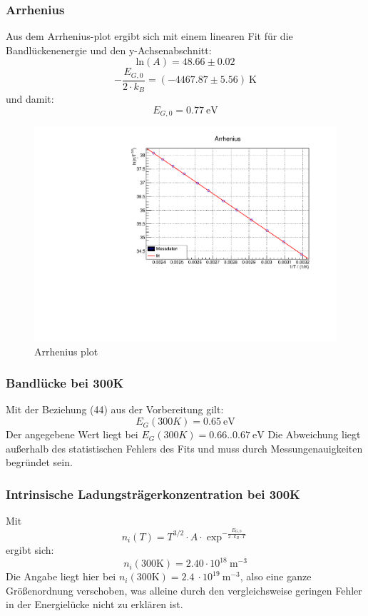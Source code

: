 \FloatBarrier

\subsubsection{Arrhenius}
\FloatBarrier

Aus dem Arrhenius-plot ergibt sich mit einem linearen Fit für die Bandlückenenergie und den y-Achsenabschnitt:
$$\text{ln}(A) = 48.66 \pm 0.02 $$
$$ - \frac{E_{G,0}}{2 \cdot k_B} = (-4467.87 \pm 5.56 ) \ \text{K}$$
und damit:
$$E_{G,0} = 0.77 \ \text{eV} $$

\begin{figure}
\label{fig:leitin}
\centering
\includegraphics[scale = 0.5]{../data/A5.pdf}
\caption{Arrhenius plot}
\end{figure}

\pagebreak

\subsubsection{Bandlücke bei 300K}
\FloatBarrier
Mit der Beziehung (44) aus der Vorbereitung gilt:
$$E_G(300K) = 0.65 \ \text{eV}$$
Der angegebene Wert liegt bei $E_G(300K) = 0.66 .. 0.67 \ \text{eV}$
Die Abweichung liegt außerhalb des statistischen Fehlers des Fits und muss durch Messungenauigkeiten begründet sein.


\subsubsection{Intrinsische Ladungsträgerkonzentration bei 300K}
\FloatBarrier
Mit 
$$ n_i (T) = T^{3/2} \cdot A \cdot \exp^{- \frac{E_{G,0}}{2 \cdot k_B \cdot T }}$$
ergibt sich:
$$n_i(300 \text{K}) = 2.40 \cdot  10^{18}\ \text{m}^{-3}$$
Die Angabe liegt hier bei $n_i(300 \text{K}) = 2.4 \ \cdot 10^{19}\ \text{m}^{-3}$, also eine ganze Größenordnung verschoben, was alleine durch den vergleichsweise geringen Fehler in der Energielücke nicht zu erklären ist.


